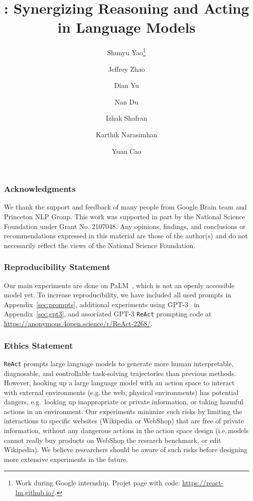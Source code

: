 \documentclass{article} %
\title{\model: Synergizing Reasoning and Acting in Language Models}
\author[*,1]{{Shunyu Yao}\thanks{Work during Google internship. Projet page with code: \url{https://react-lm.github.io/}.
}}
\author[2]{{Jeffrey Zhao}}
\author[2]{{Dian Yu}}
\author[2]{{Nan Du}}
\author[2]{{Izhak Shafran}}
\author[1]{{Karthik Narasimhan}}
\author[2]{{Yuan Cao}}
\affil[1]{Department of Computer Science, Princeton University}
\affil[2]{Google Research, Brain team}
\affil[1]{\texttt{\{shunyuy,karthikn\}@princeton.edu}}
\affil[2]{\texttt {\{jeffreyzhao,dianyu,dunan,izhak,yuancao\}@google.com}}
\newcommand{\model}{\texttt{ReAct}}
\begin{document}
\maketitle










\subsubsection*{Acknowledgments}
We thank the support and feedback of many people from Google Brain team and Princeton NLP Group.
This work was supported in part by the National Science Foundation under Grant No. 2107048. Any opinions, findings, and conclusions or recommendations expressed in this material are those of the author(s) and do not necessarily reflect the views of the National Science Foundation.

{
\subsubsection*{Reproducibility Statement}
Our main experiments are done on PaLM~\citep{chowdhery2022palm}, which is not an openly accessible model yet. To increase reproducibility, we have included all used prompts in Appendix~\ref{sec:prompts}, additional experiments using GPT-3~\citep{brown2020language} in Appendix~\ref{sec:gpt3}, and associated GPT-3 \model{} prompting code at \url{https://anonymous.4open.science/r/ReAct-2268/}. 
\subsubsection*{Ethics Statement}
\model{} prompts large language models to generate more human interpretable, diagnosable, and controllable task-solving trajectories than previous methods. 
However, hooking up a large language model with an action space to interact with external environments (e.g.\,the web, physical environments) has potential dangers, e.g.\, looking up inappropriate or private information, or taking harmful actions in an environment. 
Our experiments minimize such risks by limiting the interactions to specific websites (Wikipedia or WebShop) that are free of private information, without any dangerous actions in the action space design
(i.e.\,models cannot really buy products on WebShop the research benchmark, or edit Wikipedia).
We believe researchers should be aware of such risks before designing more extensive experiments in the future.
}







\newpage

\appendix

\end{document}
